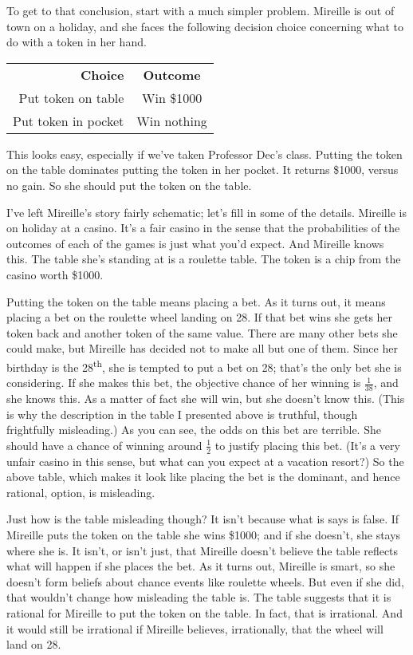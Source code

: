 \documentclass[11pt,]{book}
\def\toprule{}
\def\bottomrule{}
\begin{document}
To get to that conclusion, start with a much simpler problem. Mireille is out of town on a holiday, and she faces the following decision choice concerning what to do with a token in her hand.

\begin{longtable}[]{@{}rc@{}}
\toprule
\endhead
\textbf{Choice} & \textbf{Outcome}\tabularnewline
Put token on table & Win \$1000\tabularnewline
Put token in pocket & Win nothing\tabularnewline
\bottomrule
\end{longtable}

This looks easy, especially if we've taken Professor Dec's class. Putting the token on the table dominates putting the token in her pocket. It returns \$1000, versus no gain. So she should put the token on the table.

I've left Mireille's story fairly schematic; let's fill in some of the details. Mireille is on holiday at a casino. It's a fair casino in the sense that the probabilities of the outcomes of each of the games is just what you'd expect. And Mireille knows this. The table she's standing at is a roulette table. The token is a chip from the casino worth \$1000.

Putting the token on the table means placing a bet. As it turns out, it means placing a bet on the roulette wheel landing on 28. If that bet wins she gets her token back and another token of the same value. There are many other bets she could make, but Mireille has decided not to make all but one of them. Since her birthday is the 28\textsuperscript{th}, she is tempted to put a bet on 28; that's the only bet she is considering. If she makes this bet, the objective chance of her winning is \(\frac{1}{38}\), and she knows this. As a matter of fact she will win, but she doesn't know this. (This is why the description in the table I presented above is truthful, though frightfully misleading.) As you can see, the odds on this bet are terrible. She should have a chance of winning around \(\frac{1}{2}\) to justify placing this bet. (It's a very unfair casino in this sense, but what can you expect at a vacation resort?) So the above table, which makes it look like placing the bet is the dominant, and hence rational, option, is misleading.

Just how is the table misleading though? It isn't because what is says is false. If Mireille puts the token on the table she wins \$1000; and if she doesn't, she stays where she is. It isn't, or isn't just, that Mireille doesn't believe the table reflects what will happen if she places the bet. As it turns out, Mireille is smart, so she doesn't form beliefs about chance events like roulette wheels. But even if she did, that wouldn't change how misleading the table is. The table suggests that it is rational for Mireille to put the token on the table. In fact, that is irrational. And it would still be irrational if Mireille believes, irrationally, that the wheel will land on 28.
\end{document}

